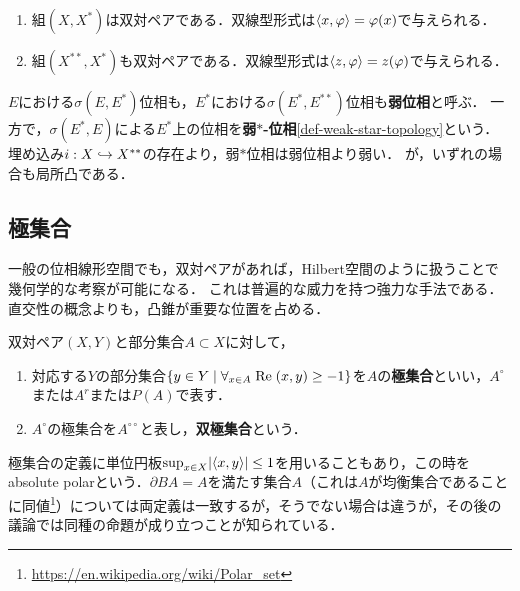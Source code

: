 \documentclass[uplatex,dvipdfmx]{jsreport}
\begin{document}
\begin{example}[自然なペアリング]\mbox{}\label{exp-dual-pair}
    \begin{enumerate}
        \item 組$(X,X^*)$は双対ペアである．双線型形式は$\langle x,\varphi\rangle=\varphi(x)$で与えられる．
        \item 組$(X^{**},X^*)$も双対ペアである．双線型形式は$\langle z,\varphi\rangle=z(\varphi)$で与えられる．
    \end{enumerate}
    $E$における$\sigma(E,E^*)$位相も，$E^*$における$\sigma(E^*,E^{**})$位相も\textbf{弱位相}と呼ぶ．
    一方で，$\sigma(E^*,E)$による$E^*$上の位相を\textbf{弱$*$-位相}\ref{def-weak-star-topology}という．
    埋め込み$i:X\hookrightarrow X^{**}$の存在より，弱$*$位相は弱位相より弱い．
    が，いずれの場合も局所凸である．
\end{example}

\subsection{極集合}

\begin{tcolorbox}[colframe=ForestGreen, colback=ForestGreen!10!white,breakable,colbacktitle=ForestGreen!40!white,coltitle=black,fonttitle=\bfseries\sffamily,
title=]
    一般の位相線形空間でも，双対ペアがあれば，Hilbert空間のように扱うことで幾何学的な考察が可能になる．
    これは普遍的な威力を持つ強力な手法である．
    直交性の概念よりも，凸錐が重要な位置を占める．
\end{tcolorbox}

\begin{definition}\label{def-polar}
    双対ペア$(X,Y)$と部分集合$A\subset X$に対して，
    \begin{enumerate}
        \item 対応する$Y$の部分集合$\left\{y\in Y\mid \forall_{x\in A}\;\mathrm{Re}\;(x,y)\ge-1\right\}$を$A$の\textbf{極集合}といい，$A^\circ$または$A^r$または$P(A)$で表す．
        \item $A^\circ$の極集合を$A^{\circ\circ}$と表し，\textbf{双極集合}という．
    \end{enumerate}
\end{definition}
\begin{remark}
    極集合の定義に単位円板$\sup_{x\in X}\lvert\langle x,y\rangle\rvert\le1$を用いることもあり，この時をabsolute polarという．$\partial BA=A$を満たす集合$A$（これは$A$が均衡集合であることに同値\footnote{\url{https://en.wikipedia.org/wiki/Polar_set}}）については両定義は一致するが，そうでない場合は違うが，その後の議論では同種の命題が成り立つことが知られている．
\end{remark}
\end{document}
